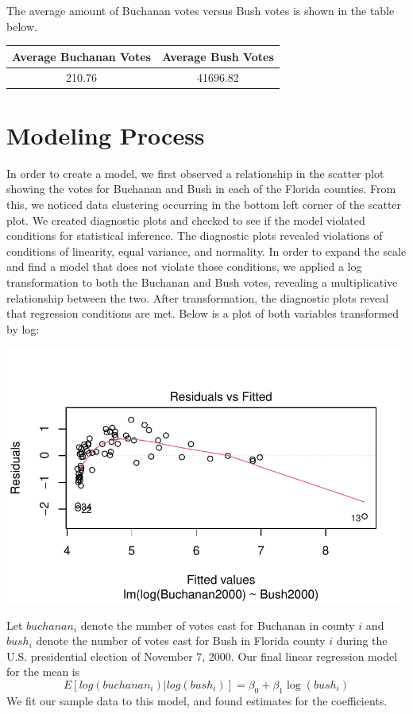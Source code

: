 \documentclass[
  letterpaper,
  DIV=11,
  numbers=noendperiod]{scrartcl}
\begin{document}
The average amount of Buchanan votes versus Bush votes is shown in the
table below.

\begin{table}[H]
\centering
\begin{tabular}[t]{cc}
\toprule
Average Buchanan Votes & Average Bush Votes\\
\midrule
210.76 & 41696.82\\
\bottomrule
\end{tabular}
\end{table}

\section{Modeling Process}\label{modeling-process}

In order to create a model, we first observed a relationship in the
scatter plot showing the votes for Buchanan and Bush in each of the
Florida counties. From this, we noticed data clustering occurring in the
bottom left corner of the scatter plot. We created diagnostic plots and
checked to see if the model violated conditions for statistical
inference. The diagnostic plots revealed violations of conditions of
linearity, equal variance, and normality. In order to expand the scale
and find a model that does not violate those conditions, we applied a
log transformation to both the Buchanan and Bush votes, revealing a
multiplicative relationship between the two. After transformation, the
diagnostic plots reveal that regression conditions are met. Below is a
plot of both variables transformed by log:

\includegraphics{case_study_1_files/figure-pdf/unnamed-chunk-4-1.pdf}

Let \(buchanan_i\) denote the number of votes cast for Buchanan in
county \(i\) and \(bush_i\) denote the number of votes cast for Bush in
Florida county \(i\) during the U.S. presidential election of November
7, 2000. Our final linear regression model for the mean is
\[E[log(buchanan_i) | log(bush_i)] = \beta_0 + \beta_1\log(bush_i)\] We
fit our sample data to this model, and found estimates for the
coefficients.
\end{document}
